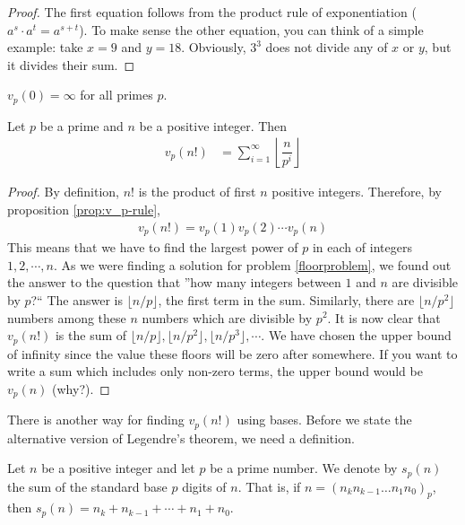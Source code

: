 \documentclass{subfile}
\begin{document}
\begin{proof}
	The first equation follows from the product rule of exponentiation ($a^{s} \cdot a^{t} = a^{s+t}$). To make sense the other equation, you can think of a simple example: take $x=9$ and $y=18$. Obviously, $3^3$ does not divide any of $x$ or $y$, but it divides their sum.
\end{proof}

\begin{note}
	$v_p(0)=\infty$ for all primes $p.$
\end{note}

\begin{theorem}\label{thm:legendre}
	Let $p$ be a prime and $n$ be a positive integer. Then
	\begin{align*}
		v_p(n!) & =\sum_{i=1}^{\infty}\left\lfloor\dfrac{n}{p^i}\right\rfloor
	\end{align*}
\end{theorem}

\begin{proof}
	By definition, $n!$ is the product of first $n$ positive integers. Therefore, by proposition \ref{prop:v_p-rule},
	\begin{align*}
		v_p(n!) = v_p(1) v_p(2) \cdots v_p(n)
	\end{align*}
	This means that we have to find the largest power of $p$ in each of integers $1,2,\cdots, n$. As we were finding a solution for problem \ref{floorproblem}, we found out the answer to the question that ''how many integers between $1$ and $n$ are divisible by $p$?`` The answer is $\lfloor n/p \rfloor$, the first term in the sum. Similarly, there are $\lfloor n/p^2 \rfloor$ numbers among these $n$ numbers which are divisible by $p^2$. It is now clear that $v_p(n!)$ is the sum of $\lfloor n/p \rfloor, \lfloor n/p^2 \rfloor, \lfloor n/p^3 \rfloor, \cdots$. We have chosen the upper bound of infinity since the value these floors will be zero after somewhere. If you want to write a sum which includes only non-zero terms, the upper bound would be $v_p(n)$ (why?).
\end{proof}
There is another way for finding $v_p(n!)$ using bases. Before we state the alternative version of Legendre's theorem, we need a definition.
\begin{definition}
	Let $n$ be a positive integer and let $p$ be a prime number.  We denote by $s_p(n)$  the sum of the standard base $p$ digits of $n$. That is, if $n=(n_k n_{k-1}\ldots n_1 n_0)_p$, then $s_p(n)=n_k+ n_{k-1}+\cdots +n_1+ n_0$.
\end{definition}
\end{document}
